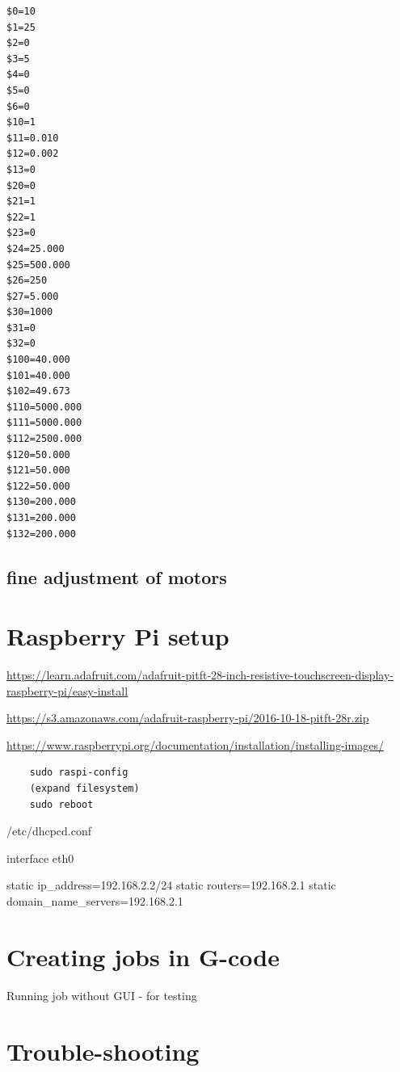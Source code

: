 \documentclass[]{book}
\theoremstyle{definition}
\theoremstyle{definition}
\theoremstyle{remark}
\begin{document}
\begin{verbatim}
$0=10
$1=25
$2=0
$3=5
$4=0
$5=0
$6=0
$10=1
$11=0.010
$12=0.002
$13=0
$20=0
$21=1
$22=1
$23=0
$24=25.000
$25=500.000
$26=250
$27=5.000
$30=1000
$31=0
$32=0
$100=40.000
$101=40.000
$102=49.673
$110=5000.000
$111=5000.000
$112=2500.000
$120=50.000
$121=50.000
$122=50.000
$130=200.000
$131=200.000
$132=200.000
\end{verbatim}

\section{fine adjustment of motors}\label{fine-adjustment-of-motors}

\chapter{Raspberry Pi setup}\label{raspberry-pi-setup}

\url{https://learn.adafruit.com/adafruit-pitft-28-inch-resistive-touchscreen-display-raspberry-pi/easy-install}

\url{https://s3.amazonaws.com/adafruit-raspberry-pi/2016-10-18-pitft-28r.zip}

\url{https://www.raspberrypi.org/documentation/installation/installing-images/}

\begin{verbatim}
    sudo raspi-config
    (expand filesystem)
    sudo reboot
\end{verbatim}

/etc/dhcpcd.conf

interface eth0

static ip\_address=192.168.2.2/24 static routers=192.168.2.1 static
domain\_name\_servers=192.168.2.1

\chapter{Creating jobs in G-code}\label{creating-jobs-in-g-code}

Running job without GUI - for testing

\chapter{Trouble-shooting}\label{trouble-shooting}


\end{document}
